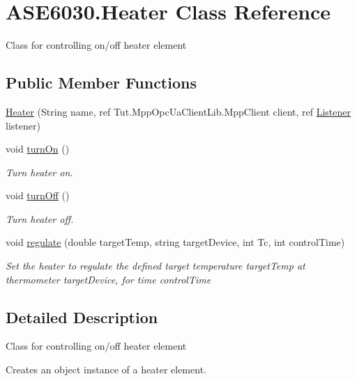 \hypertarget{class_a_s_e6030_1_1_heater}{}\section{A\+S\+E6030.\+Heater Class Reference}
\label{class_a_s_e6030_1_1_heater}


Class for controlling on/off heater element  


\subsection*{Public Member Functions}
\begin{DoxyCompactItemize}
\item 
\hyperlink{class_a_s_e6030_1_1_heater_a1c0420d0f56eb7e1a7d43c44520ae07b}{Heater} (String name, ref Tut.\+Mpp\+Opc\+Ua\+Client\+Lib.\+Mpp\+Client client, ref \hyperlink{class_a_s_e6030_1_1_listener}{Listener} listener)
\item 
void \hyperlink{class_a_s_e6030_1_1_heater_a0ef024666587dbe494c647214658b412}{turn\+On} ()
\begin{DoxyCompactList}\small\item\em Turn heater on. \end{DoxyCompactList}\item 
void \hyperlink{class_a_s_e6030_1_1_heater_a38a0281112b0ab7d5922e52d0a2cecec}{turn\+Off} ()
\begin{DoxyCompactList}\small\item\em Turn heater off. \end{DoxyCompactList}\item 
void \hyperlink{class_a_s_e6030_1_1_heater_a6b695a9e9acf4ae4947bf3a968c8e6e3}{regulate} (double target\+Temp, string target\+Device, int Tc, int control\+Time)
\begin{DoxyCompactList}\small\item\em Set the heater to regulate the defined target temperature target\+Temp at thermometer target\+Device, for time control\+Time \end{DoxyCompactList}\end{DoxyCompactItemize}


\subsection{Detailed Description}
Class for controlling on/off heater element 

Creates an object instance of a heater element. 

